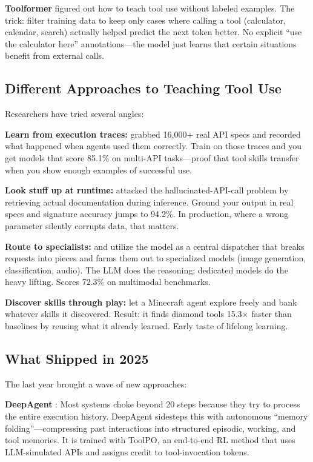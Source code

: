 \documentclass[12pt,a4paper]{report}
\theoremstyle{definition}
\begin{document}
\textbf{Toolformer} \cite{schick2023toolformer} figured out how to teach tool use without labeled examples. The trick: filter training data to keep only cases where calling a tool (calculator, calendar, search) actually helped predict the next token better. No explicit ``use the calculator here'' annotations---the model just learns that certain situations benefit from external calls.

\subsection{Different Approaches to Teaching Tool Use}
\label{sec:tool_learning}

Researchers have tried several angles:

\textbf{Learn from execution traces:} \citet{qin2023toolllm} grabbed 16,000+ real API specs and recorded what happened when agents used them correctly. Train on those traces and you get models that score 85.1\% on multi-API tasks---proof that tool skills transfer when you show enough examples of successful use.

\textbf{Look stuff up at runtime:} \citet{patil2023gorilla} attacked the hallucinated-API-call problem by retrieving actual documentation during inference. Ground your output in real specs and signature accuracy jumps to 94.2\%. In production, where a wrong parameter silently corrupts data, that matters.

\textbf{Route to specialists:} \citet{shen2023hugginggpt} and \citet{liang2023taskmatrix} utilize the model as a central dispatcher
 that breaks requests into pieces and farms them out to specialized models (image generation, classification, audio).
 The LLM does the reasoning; dedicated models do the heavy lifting. Scores 72.3\% on multimodal benchmarks.

\textbf{Discover skills through play:} \citet{wang2023voyager} let a Minecraft agent explore freely and bank whatever skills it discovered. Result: it finds diamond tools 15.3$\times$ faster than baselines by reusing what it already learned. Early taste of lifelong learning.

\subsection{What Shipped in 2025}
\label{sec:tool_learning_2025}

The last year brought a wave of new approaches:

\textbf{DeepAgent} \cite{li2025deepagent}: Most systems choke beyond 20 steps because they try to process the entire execution history. DeepAgent sidesteps this with autonomous ``memory folding''---compressing past interactions into structured episodic, working, and tool memories. It is trained with ToolPO, an end-to-end RL method that uses LLM-simulated APIs and assigns credit to tool-invocation tokens.
\end{document}
